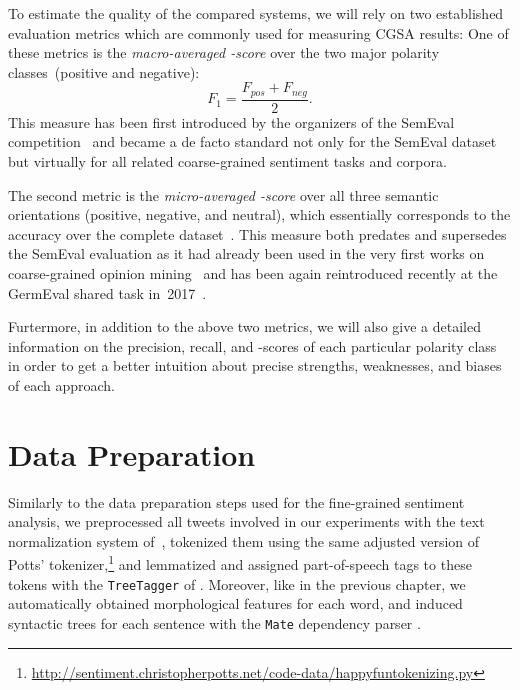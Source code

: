 To estimate the quality of the compared systems, we will rely on two
established evaluation metrics which are commonly used for measuring
CGSA results: One of these metrics is the \emph{macro-averaged
  \F-score} over the two major polarity classes~(positive and
negative): { \small%
  \begin{equation*}
    F_1 = \frac{F_{pos} + F_{neg}}{2}.
  \end{equation*}%
  \normalsize%
}%
This measure has been first introduced by the organizers of the
SemEval competition~\cite{Nakov:13,Rosenthal:14,Rosenthal:15} and
became a de facto standard not only for the SemEval dataset but
virtually for all related coarse-grained sentiment tasks and corpora.

The second metric is the \emph{micro-averaged \F-score} over all three
semantic orientations (positive, negative, and neutral), which
essentially corresponds to the accuracy over the complete
dataset~\cite[see][p.~577]{Manning:99}.  This measure both predates
and supersedes the SemEval evaluation as it had already been used in
the very first works on coarse-grained opinion
mining~\cite{Wiebe:99,Das:01,Read:05,Kennedy:06,Go:09} and has been
again reintroduced recently at the GermEval shared task
in~2017~\cite{Wojatzki:17}.

Furtermore, in addition to the above two metrics, we will also give a
detailed information on the precision, recall, and \F-scores of each
particular polarity class in order to get a better intuition about
precise strengths, weaknesses, and biases of each approach.

\section{Data Preparation}\label{sec:cgsa:data}

Similarly to the data preparation steps used for the fine-grained
sentiment analysis, we preprocessed all tweets involved in our
experiments with the text normalization system
of~\citet{Sidarenka:13}, tokenized them using the same adjusted
version of Potts'
tokenizer,\footnote{\url{http://sentiment.christopherpotts.net/code-data/happyfuntokenizing.py}}
and lemmatized and assigned part-of-speech tags to these tokens with
the \texttt{TreeTagger} of \citet{Schmid:95}.  Moreover, like in the
previous chapter, we automatically obtained morphological features for
each word, and induced syntactic trees for each sentence with the \texttt{Mate} dependency parser \cite{Bohnet:13}.

